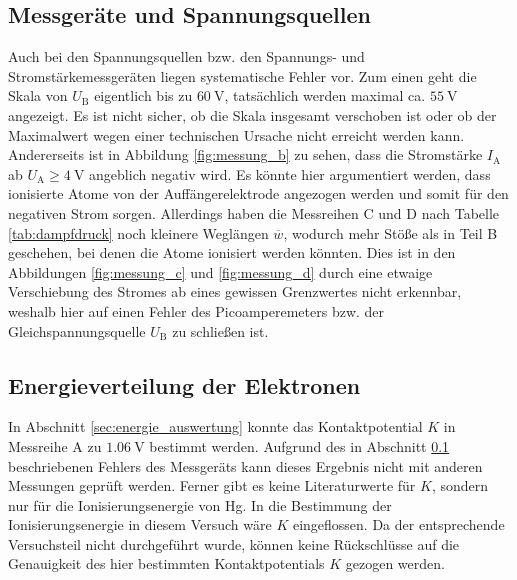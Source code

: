 \subsection{Messgeräte und Spannungsquellen}
\label{sec:geraete}
Auch bei den Spannungsquellen bzw. den Spannungs- und Stromstärkemessgeräten liegen systematische Fehler vor.
Zum einen geht die Skala von $U_\text{B}$ eigentlich bis zu $\qty[]{60}{\volt}$, tatsächlich werden maximal ca. $\qty[]{55}{\volt}$ angezeigt.
Es ist nicht sicher, ob die Skala insgesamt verschoben ist oder ob der Maximalwert wegen einer technischen Ursache nicht erreicht werden kann.
Andererseits ist in Abbildung \ref{fig:messung_b} zu sehen, dass die Stromstärke $I_\text{A}$ ab $U_\text{A} \geq \qty[]{4}{\volt}$ angeblich negativ wird.
Es könnte hier argumentiert werden, dass ionisierte Atome von der Auffängerelektrode angezogen werden und somit für den negativen Strom sorgen.
Allerdings haben die Messreihen C und D nach Tabelle \ref{tab:dampfdruck} noch kleinere Weglängen $\overline{w}$, wodurch mehr Stöße als in Teil B geschehen,
bei denen die Atome ionisiert werden könnten.
Dies ist in den Abbildungen \ref{fig:messung_c} und \ref{fig:messung_d} durch eine etwaige Verschiebung des Stromes ab eines gewissen Grenzwertes nicht erkennbar, 
weshalb hier auf einen Fehler des Picoamperemeters bzw. der Gleichspannungsquelle $U_\text{B}$ zu schließen ist. 



\subsection{Energieverteilung der Elektronen}
In Abschnitt \ref{sec:energie_auswertung} konnte das Kontaktpotential $K$ in Messreihe A zu $\qty{1.06}{\volt}$ bestimmt werden.
Aufgrund des in Abschnitt \ref{sec:geraete} beschriebenen Fehlers des Messgeräts kann dieses Ergebnis nicht mit anderen Messungen geprüft werden.
Ferner gibt es keine Literaturwerte für $K$, sondern nur für die Ionisierungsenergie von Hg.
In die Bestimmung der Ionisierungsenergie in diesem Versuch wäre $K$ eingeflossen.
Da der entsprechende Versuchsteil nicht durchgeführt wurde, können keine Rückschlüsse auf die Genauigkeit des hier bestimmten Kontaktpotentials $K$ gezogen werden.











